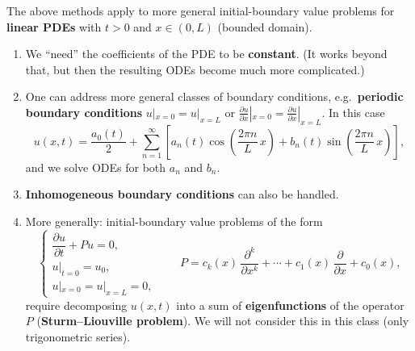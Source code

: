 \begin{remark}
The above methods apply to more general initial-boundary value problems for \textbf{linear PDEs} with $t > 0$ and $x \in (0, L)$ (bounded domain).

\begin{enumerate}
\item We ``need'' the coefficients of the PDE to be \textbf{constant}. (It works beyond that, but then the resulting ODEs become much more complicated.)

\item One can address more general classes of boundary conditions, e.g.\ \textbf{periodic boundary conditions} $u|_{x=0} = u|_{x=L}$ or $\frac{\partial u}{\partial x}|_{x=0} = \frac{\partial u}{\partial x}|_{x=L}$. In this case
\[
u(x, t) = \frac{a_0(t)}{2} + \sum_{n=1}^{\infty}\left[a_n(t)\cos\!\left(\frac{2\pi n}{L}\,x\right) + b_n(t)\sin\!\left(\frac{2\pi n}{L}\,x\right)\right],
\]
and we solve ODEs for both $a_n$ and $b_n$.

\item \textbf{Inhomogeneous boundary conditions} can also be handled.

\item More generally: initial-boundary value problems of the form
\[
\begin{cases}
\dfrac{\partial u}{\partial t} + Pu = 0, \\[2pt]
u|_{t=0} = u_0, \\[2pt]
u|_{x=0} = u|_{x=L} = 0,
\end{cases}
\qquad P = c_k(x)\,\frac{\partial^k}{\partial x^k} + \cdots + c_1(x)\,\frac{\partial}{\partial x} + c_0(x),
\]
require decomposing $u(x, t)$ into a sum of \textbf{eigenfunctions} of the operator $P$ (\textbf{Sturm--Liouville problem}). We will not consider this in this class (only trigonometric series).
\end{enumerate}
\end{remark}
